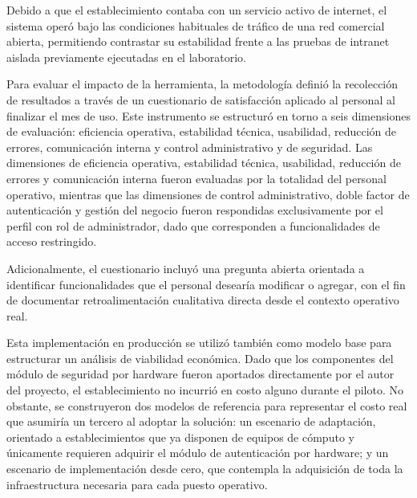 Debido a que el establecimiento contaba con un servicio activo de internet, el sistema operó
bajo las condiciones habituales de tráfico de una red comercial abierta, permitiendo contrastar
su estabilidad frente a las pruebas de intranet aislada previamente ejecutadas en el laboratorio.

Para evaluar el impacto de la herramienta, la metodología definió la recolección de resultados
a través de un cuestionario de satisfacción aplicado al personal al finalizar el mes de uso.
Este instrumento se estructuró en torno a seis dimensiones de evaluación: eficiencia operativa,
estabilidad técnica, usabilidad, reducción de errores, comunicación interna y control
administrativo y de seguridad. Las dimensiones de eficiencia operativa, estabilidad técnica,
usabilidad, reducción de errores y comunicación interna fueron evaluadas por la totalidad del
personal operativo, mientras que las dimensiones de control administrativo, doble factor de
autenticación y gestión del negocio fueron respondidas exclusivamente por el perfil con rol
de administrador, dado que corresponden a funcionalidades de acceso restringido.

Adicionalmente, el cuestionario incluyó una pregunta abierta orientada a identificar
funcionalidades que el personal desearía modificar o agregar, con el fin de documentar
retroalimentación cualitativa directa desde el contexto operativo real. 

Esta implementación en producción se utilizó también como modelo base para estructurar un
análisis de viabilidad económica. Dado que los componentes del módulo de seguridad por
hardware fueron aportados directamente por el autor del proyecto, el establecimiento no
incurrió en costo alguno durante el piloto. No obstante, se construyeron dos modelos de
referencia para representar el costo real que asumiría un tercero al adoptar la solución:
un escenario de adaptación, orientado a establecimientos que ya disponen de equipos de
cómputo y únicamente requieren adquirir el módulo de autenticación por hardware; y un
escenario de implementación desde cero, que contempla la adquisición de toda la
infraestructura necesaria para cada puesto operativo.